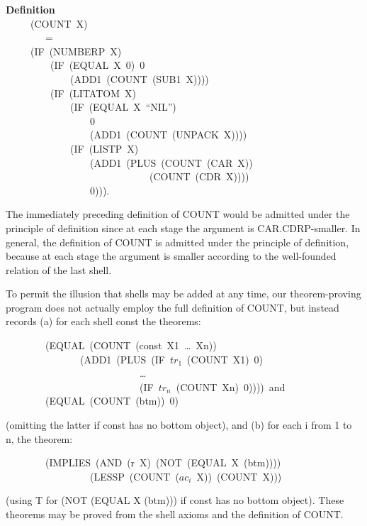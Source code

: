 \documentclass[10pt]{book}
\newenvironment{pubasis}{\begin{flushleft}}{\end{flushleft}}
\newcommand{\axiomordefinition}[1]{\vspace{6pt}\Large\textsf{\textbf{#1}}\normalsize}
\begin{document}
\begin{pubasis}
\axiomordefinition{Definition}\\
~~~~~(COUNT~X)\\
~~~~~~~~=\\
~~~~~(IF~(NUMBERP~X)\\
~~~~~~~~~(IF~(EQUAL~X~0)~0\\
~~~~~~~~~~~~~(ADD1~(COUNT~(SUB1~X))))\\
~~~~~~~~~(IF~(LITATOM~X)\\
~~~~~~~~~~~~~(IF~(EQUAL~X~``NIL'')\\
~~~~~~~~~~~~~~~~~0\\
~~~~~~~~~~~~~~~~~(ADD1~(COUNT~(UNPACK~X))))\\
~~~~~~~~~~~~~(IF~(LISTP~X)\\
~~~~~~~~~~~~~~~~~(ADD1~(PLUS~(COUNT~(CAR~X))\\
~~~~~~~~~~~~~~~~~~~~~~~~~~~~~(COUNT~(CDR~X))))\\
~~~~~~~~~~~~~~~~~0))).\\
\end{pubasis}

\hrulefill 

The immediately preceding definition of COUNT would be admitted under the principle of
definition since at each stage the argument is
CAR.CDRP-smaller.
In general, the definition of COUNT is admitted under
the principle of definition, because at each stage the
argument is smaller according to the well-founded relation
of the last shell.

To permit the illusion that shells may be added at any time,
our theorem-proving program does not actually employ the 
full definition of COUNT, but instead records (a) for
each shell const the theorems:
\begin{pubasis}
~~~~~~~~(EQUAL~(COUNT~(const~X1~\ldots{}~Xn))\\
~~~~~~~~~~~~~~~(ADD1~(PLUS~(IF~$tr_{1}$~(COUNT~X1)~0)\\
~~~~~~~~~~~~~~~~~~~~~~~~~~~\ldots{}\\
~~~~~~~~~~~~~~~~~~~~~~~~~~~(IF~$tr_{n}$~(COUNT~Xn)~0))))~and\\

~~~~~~~~(EQUAL~(COUNT~(btm))~0)\\
\end{pubasis}
(omitting the latter if const has no bottom object),
and (b) for each i from 1 to n,
the theorem:
\begin{pubasis}
~~~~~~~~(IMPLIES~(AND~(r~X)~(NOT~(EQUAL~X~(btm))))\\
~~~~~~~~~~~~~~~~~(LESSP~(COUNT~($ac_{i}$~X))~(COUNT~X)))\\
\end{pubasis}
(using T for (NOT (EQUAL X  (btm))) if const has no bottom object).
These theorems may be proved from the shell axioms
and the definition of COUNT.
\end{document}
